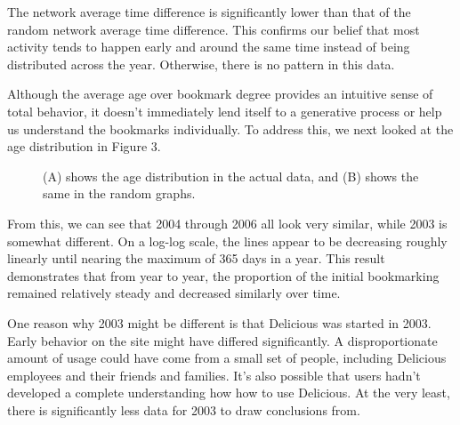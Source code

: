 \documentclass[11pt]{amsart}
\begin{document}
The network average time difference is significantly lower than that of the random network average time difference. This confirms our belief that most activity tends to happen early and around the same time instead of being distributed across the year. Otherwise, there is no pattern in this data.

Although the average age over bookmark degree provides an intuitive sense of total behavior, it doesn't immediately lend itself to a generative process or help us understand the bookmarks individually. To address this, we next looked at the age distribution in Figure 3.

\begin{figure}
	\centering
\caption{(A) shows the age distribution in the actual data, and (B) shows the same in the random graphs.}
\end{figure}

From this, we can see that 2004 through 2006 all look very similar, while 2003 is somewhat different. On a log-log scale, the lines appear to be decreasing roughly linearly until nearing the maximum of 365 days in a year. This result demonstrates that from year to year, the proportion of the initial bookmarking remained relatively steady and decreased similarly over time.

One reason why 2003 might be different is that Delicious was started in 2003. Early behavior on the site might have differed significantly. A disproportionate amount of usage could have come from a small set of people, including Delicious employees and their friends and families. It's also possible that users hadn't developed a complete understanding how how to use Delicious. At the very least, there is significantly less data for 2003 to draw conclusions from.
\end{document}
